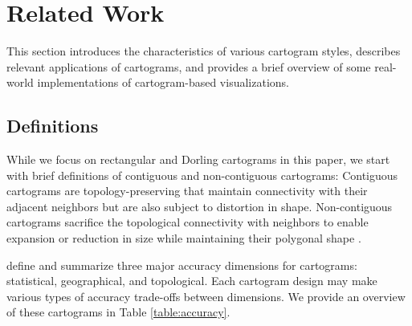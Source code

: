 \section{Related Work}

This section introduces the characteristics of various cartogram styles, describes relevant applications of cartograms, and provides a brief overview of some real-world implementations of cartogram-based visualizations.

\subsection{Definitions}

While we focus on rectangular and Dorling cartograms in this paper, we start with brief definitions of contiguous and non-contiguous cartograms: Contiguous cartograms are topology-preserving that maintain connectivity with their adjacent neighbors but are also subject to distortion in shape. Non-contiguous cartograms sacrifice the topological connectivity with neighbors to enable expansion or reduction in size while maintaining their polygonal shape \cite{dent2009Cartography}.

 define and summarize three major accuracy dimensions for cartograms: statistical, geographical, and topological. Each cartogram design may make various types of accuracy trade-offs between dimensions. We provide an overview of these cartograms in Table \ref{table:accuracy}.


{
\renewcommand{\arraystretch}{1.5}
\begin{table}[!tb]
	\centering
	\caption{\textcolor{Mycolor3}{\textbf{Trade-off between dimensions}}. \textcolor{Mycolor6}{\textbf{Dimension sacrificed}} in order to improve \textcolor{Mycolor5}{\textbf{target dimension}}'s accuracy.}
	\label{table:accuracy}
\end{table}
}


